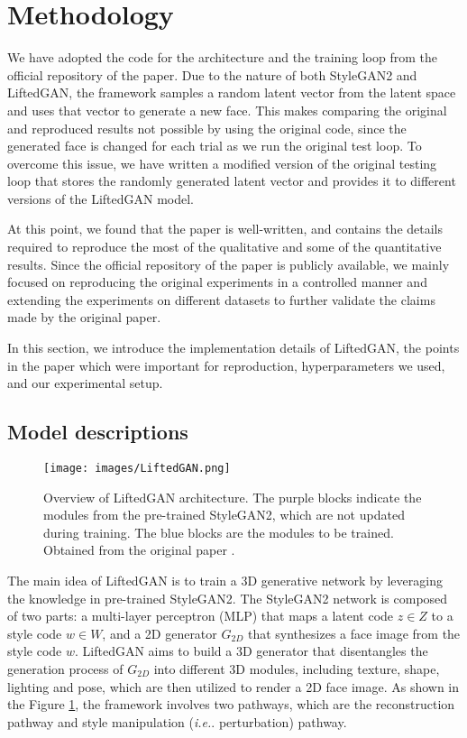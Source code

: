 \section{Methodology}
We have adopted the code for the architecture and the training loop from the official repository of the paper. Due to the nature of both StyleGAN2 and LiftedGAN, the framework samples a random latent vector from the latent space and uses that vector to generate a new face. This makes comparing the original and reproduced results not possible by using the original code, since the generated face is changed for each trial as we run the original test loop. To overcome this issue, we have written a modified version of the original testing loop that stores the randomly generated latent vector and provides it to different versions of the LiftedGAN model.

At this point, we found that the paper is well-written, and contains the details required to reproduce the most of the qualitative and some of the quantitative results. Since the official repository of the paper is publicly available, we mainly focused on reproducing the original experiments in a controlled manner and extending the experiments on different datasets to further validate the claims made by the original paper.

In this section, we introduce the implementation details of LiftedGAN, the points in the paper which were important for reproduction, hyperparameters we used, and our experimental setup.

\subsection{Model descriptions}
\label{model_desc}

\begin{figure}[t]
\centering
\texttt{[image: images/LiftedGAN.png]}
\caption{Overview of LiftedGAN architecture. The purple blocks indicate the modules from the pre-trained StyleGAN2, which are not updated during training. The blue blocks are the modules to be trained. Obtained from the original paper \cite{shi2021lifting}.}
\label{fig:LiftedGAN}
\end{figure}

The main idea of LiftedGAN is to train a 3D generative network by leveraging the knowledge in pre-trained StyleGAN2. The StyleGAN2 network is composed of two parts: a multi-layer perceptron (MLP) that maps a latent code $z \in Z$ to a style code $w \in W$, and a 2D generator $G_{2D}$ that synthesizes a face image from the style code $w$. LiftedGAN aims to build a 3D generator that disentangles the generation process of $G_{2D}$ into different 3D modules, including texture, shape, lighting and pose, which are then utilized to render a 2D face image. As shown in the Figure \ref{fig:LiftedGAN}, the framework involves two pathways, which are the reconstruction pathway and style manipulation (\textit{i.e.}. perturbation) pathway. 

